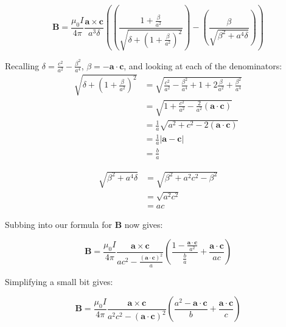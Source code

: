 \documentclass[12pt,a4paper]{report}
\theoremstyle{definition}
\begin{document}
\begin{equation}
  \mathbf{B} = \frac{\mu_0 I}{4\pi} \frac{\mathbf{a} \times \mathbf{c}}{a^3\delta} \left( \left( \frac{1 + \frac{\beta}{a^2}}{\sqrt{\delta + \left( 1 + \frac{\beta}{a^2} \right)^2}} \right) - \left( \frac{\beta}{\sqrt{\beta^2 + a^4 \delta}} \right)  \right) 
\end{equation}

Recalling $\delta = \frac{c^2}{a^2} - \frac{\beta^2}{a^4}$, $\beta = -\mathbf{a} \cdot \mathbf{c}$, and looking at each of the denominators:
\begin{align*}
  \sqrt{\delta + \left( 1 + \frac{\beta}{a^2} \right)^2} &= \sqrt{\frac{c^2}{a^2} - \frac{\beta^2}{a^4} + 1 + 2\frac{\beta}{a^2} + \frac{\beta^2}{a^4}} \\
                             &= \sqrt{1 + \frac{c^2}{a^2} - \frac{2}{a^2} \left(\mathbf{a} \cdot \mathbf{c} \right)} \\
                             &= \frac{1}{a} \sqrt{a^2 + c^2 - 2\left(\mathbf{a} \cdot \mathbf{c}\right)} \\
                             &= \frac{1}{a} \left \vert \mathbf{a} - \mathbf{c} \right \vert \\
                             &= \frac{b}{a}
\end{align*}

\begin{align*}
  \sqrt{\beta^2 + a^4 \delta} &= \sqrt{\beta^2 + a^2c^2 - \beta^2} \\
                              &= \sqrt{a^2c^2} \\
                              &= ac
\end{align*}

Subbing into our formula for $\mathbf{B}$ now gives:

\begin{equation}
  \mathbf{B} = \frac{\mu_0 I}{4\pi} \frac{\mathbf{a}\times \mathbf{c}}{ac^2 - \frac{\left(\mathbf{a} \cdot \mathbf{c}\right)^2}{a}} \left( \frac{1 - \frac{\mathbf{a}\cdot{\mathbf{c}}}{a^2}}{\frac{b}{a}} + \frac{\mathbf{a} \cdot \mathbf{c}}{ac} \right)
\end{equation}

Simplifying a small bit gives:

\begin{equation}
\mathbf{B} = \frac{\mu_0 I}{4\pi} \frac{\mathbf{a}\times \mathbf{c}}{a^2c^2 - \left(\mathbf{a} \cdot \mathbf{c}\right)^2} \left( \frac{a^2 - \mathbf{a}\cdot\mathbf{c}}{b} + \frac{\mathbf{a} \cdot \mathbf{c}}{c} \right)
\end{equation}
\end{document}
